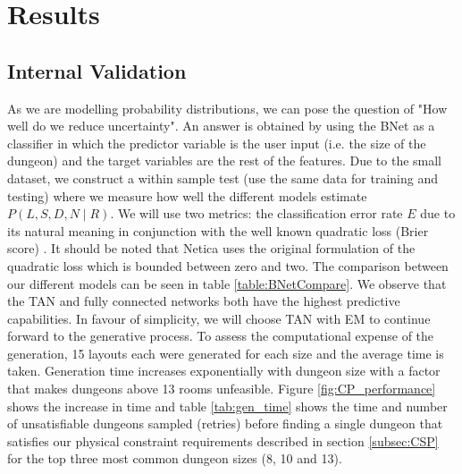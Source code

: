 \documentclass{UoYCSproject}
\begin{document}
\chapter{Results}
\label{cha:results}
\section{Internal Validation}
As we are modelling probability distributions, we can pose the question of "How well do we reduce uncertainty". An answer is obtained by using the BNet as a classifier in which the predictor variable is the user input (i.e. the size of the dungeon) and the target variables are the rest of the features. Due to the small dataset, we construct a within sample test (use the same data for training and testing) where we measure how well the different models estimate \(P(L,S,D,N\mid R)\). We will use two metrics: the classification error rate \(E\) due to its natural meaning in conjunction with the well known quadratic loss (Brier score) \parencite{PearlScoringRules}. It should be noted that Netica uses the original formulation of the quadratic loss which is bounded between zero and two. The comparison between our different models can be seen in table \ref{table:BNetCompare}. We observe that the TAN and fully connected networks both have the highest predictive capabilities. In favour of simplicity, we will choose TAN with EM to continue forward to the generative process. 
To assess the computational expense of the generation, 15 layouts each were generated for each size and the average time is taken. Generation time increases exponentially with dungeon size with a factor that makes dungeons above 13 rooms unfeasible. Figure \ref{fig:CP_performance} shows the increase in time and table \ref{tab:gen_time} shows the time and number of unsatisfiable dungeons sampled (retries) before finding a single dungeon that satisfies our physical constraint requirements described in section \ref{subsec:CSP} for the top three most common dungeon sizes (8, 10 and 13).

\end{document}
